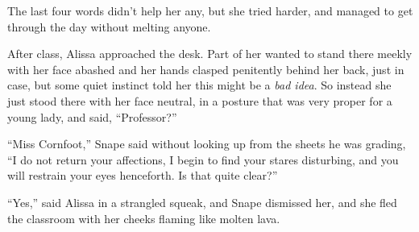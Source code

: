 The last four words didn't help her any, but she tried harder, and managed to get through the day without melting anyone.

After class, Alissa approached the desk. Part of her wanted to stand there meekly with her face abashed and her hands clasped penitently behind her back, just in case, but some quiet instinct told her this might be a \emph{bad idea}. So instead she just stood there with her face neutral, in a posture that was very proper for a young lady, and said, ``Professor?''

``Miss Cornfoot,'' Snape said without looking up from the sheets he was grading, ``I do not return your affections, I begin to find your stares disturbing, and you will restrain your eyes henceforth. Is that quite clear?''

``Yes,'' said Alissa in a strangled squeak, and Snape dismissed her, and she fled the classroom with her cheeks flaming like molten lava.
